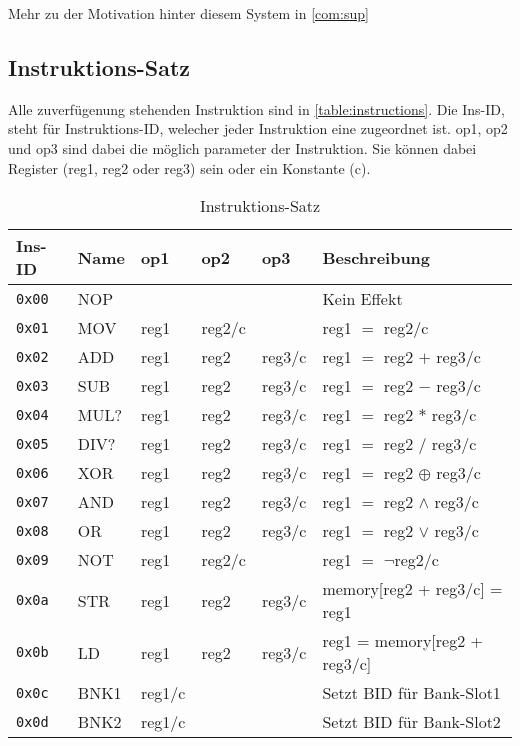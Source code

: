 \documentclass{scrartcl}
\begin{document}
Mehr zu der Motivation hinter diesem System in \autoref{com:sup}

\subsection{\label{section:insSet}Instruktions-Satz}

Alle zuverfügenung stehenden Instruktion sind in \autoref{table:instructions}. Die Ins-ID, steht für Instruktions-ID, welecher jeder Instruktion eine zugeordnet ist. op1, op2 und op3 sind dabei die möglich parameter der Instruktion. Sie können dabei Register (reg1, reg2 oder reg3) sein oder ein Konstante (c).

\begin{center}
	\begin{table*}
		\caption{\label{table:instructions}Instruktions-Satz}
		\begin{tabular}{l | l l l l | l}
			Ins-ID & Name & op1 & op2 & op3 & Beschreibung \\
			\hline
			\texttt{0x00} & NOP  &  &  &  & Kein Effekt  \\
			\hline
			\texttt{0x01} & MOV  & reg1 & reg2/c &  & reg1 $=$ reg2/c\\
			\texttt{0x02} & ADD  & reg1 & reg2 & reg3/c & reg1 $=$ reg2 $+$ reg3/c \\
			\texttt{0x03} & SUB  & reg1 & reg2 & reg3/c & reg1 $=$ reg2 $-$ reg3/c \\
			\texttt{0x04} & MUL? & reg1 & reg2 & reg3/c & reg1 $=$ reg2 $*$ reg3/c \\
			\texttt{0x05} & DIV? & reg1 & reg2 & reg3/c & reg1 $=$ reg2 $/$ reg3/c \\
			\texttt{0x06} & XOR  & reg1 & reg2 & reg3/c & reg1 $=$ reg2 $\oplus$ reg3/c \\
			\texttt{0x07} & AND  & reg1 & reg2 & reg3/c & reg1 $=$ reg2 $\land$ reg3/c \\
			\texttt{0x08} & OR   & reg1 & reg2 & reg3/c & reg1 $=$ reg2 $\lor$ reg3/c \\
			\texttt{0x09} & NOT  & reg1 & reg2/c &      & reg1 $=$ $\lnot$reg2/c \\
			\hline 
			\texttt{0x0a} & STR  & reg1 & reg2 & reg3/c & memory[reg2 + reg3/c] = reg1  \\
			\texttt{0x0b} & LD   & reg1 & reg2 & reg3/c & reg1 = memory[reg2 + reg3/c] \\
			\texttt{0x0c} & BNK1 & reg1/c &  &  & Setzt BID für Bank-Slot1 \\
			\texttt{0x0d} & BNK2 & reg1/c &  &  & Setzt BID für Bank-Slot2 \\

\end{tabular}
\end{table*}
\end{center}
\end{document}
